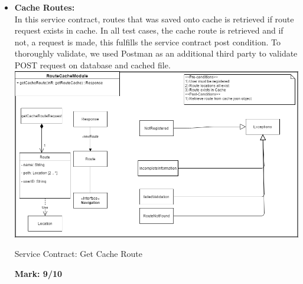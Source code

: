 \begin{itemize}
\item \textbf{Cache Routes:}\\In this service contract, routes that was saved onto cache is retrieved if route request exists in cache. In all test cases, the cache route is retrieved and if not, a request is made, this fulfills the service contract post condition. To thoroughly validate, we used Postman as an additional third party to validate POST request on database and cached file.\\
\includegraphics[scale=0.5]{CacheRoute.png}
\caption{Service Contract: Get Cache Route}
	\textbf{Mark: 9/10}
	
\end{itemize}